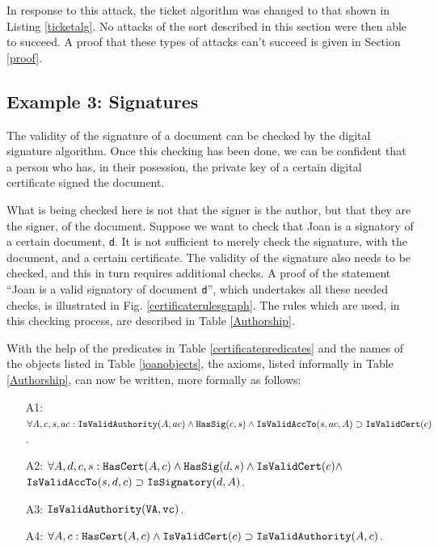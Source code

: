 In response to this attack, the ticket algorithm was changed to that shown in Listing \ref{ticketalg}. No attacks of the sort
described in this section were then able to succeed. A proof that these types of attacks can't succeed is given in Section \ref{proof}. 
\fi

\subsection{Example 3: Signatures}\label{exm3}
The validity of the signature of
a document can be checked by the digital signature algorithm.
Once this checking has been done, we can be confident that a person
who has, in their posession, the private key of a certain digital certificate
signed the document. 

What is being checked here is not that the signer is the author, but that they 
are the signer, of the document. Suppose we want to check that Joan is a signatory
of a certain document, {\tt d}. It is not sufficient to merely check the signature,
with the document, and a certain certificate. The validity of the signature also needs
to be checked, and this in turn requires additional checks.
A proof of the statement ``Joan is a valid signatory of document {\tt d}'', which undertakes
all these needed checks, is illustrated in Fig. \ref{certificaterulesgraph}. 
The rules which are used, in this checking process, are described in Table \ref{Authorship}.

With the help of the predicates in Table \ref{certificatepredicates} and the names
of the objects listed in Table \ref{joanobjects}, the 
axioms, listed informally in Table \ref{Authorship}, can now be written, more formally as follows:
\begin{itemize}
		\item[A1:]\label{A1a} 
$\forall A, c, s, ac:\hbox{\tt IsValidAuthority}(A,ac) \wedge \hbox{\tt HasSig}(c,s) \\
	\wedge \hbox{\tt IsValidAccTo}(s,ac,A) \supset \hbox{\tt IsValidCert}(c)$.
	\item[A2:] $\forall A, d, c, s: \hbox{\tt HasCert}(A,c) \wedge \hbox{\tt HasSig}(d,s) \\
	\wedge \hbox{\tt IsValidCert}(c) \wedge$\\
${\tt IsValidAccTo}(s,d,c) \supset \hbox{\tt IsSignatory}(d,A)$.
	\item[A3:] $\hbox{\tt IsValidAuthority}(\hbox{\tt VA},{\tt vc})$.
	\item[A4:] $\forall A, c:\hbox{\tt HasCert}(A,c) \wedge \hbox{\tt IsValidCert}(c) \supset \hbox{\tt IsValidAuthority}(A,c)$.
\end{itemize}

